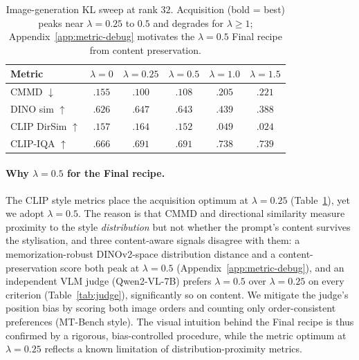 \documentclass{article}
\begin{document}
\begin{table}[t]
\centering\small
\setlength{\tabcolsep}{9pt}
\begin{tabular}{lccccc}
\toprule
\textbf{Metric} & $\lambda{=}0$ & $\lambda{=}0.25$ & $\lambda{=}0.5$ & $\lambda{=}1.0$ & $\lambda{=}1.5$ \\
\midrule
CMMD $\downarrow$       & $.155$ & $\mathbf{.100}$ & $.108$ & $.205$ & $.221$ \\
DINO sim $\uparrow$     & $.626$ & $\mathbf{.647}$ & $.643$ & $.439$ & $.388$ \\
CLIP DirSim $\uparrow$  & $.157$ & $\mathbf{.164}$ & $.152$ & $.049$ & $.024$ \\
CLIP-IQA $\uparrow$     & $.666$ & $.691$ & $\mathbf{.691}$ & $.738$ & $.739$ \\

\bottomrule
\end{tabular}
\caption{Image-generation KL sweep at rank $32$. Acquisition (bold = best) peaks
near $\lambda{=}0.25$ to $0.5$ and degrades for $\lambda\geq1$; Appendix~\ref{app:metric-debug}
motivates the $\lambda{=}0.5$ Final recipe from content preservation.}
\label{tab:kl}
\end{table}

\paragraph{Why $\lambda{=}0.5$ for the Final recipe.}
The CLIP style metrics place the acquisition optimum at $\lambda{=}0.25$
(Table~\ref{tab:kl}), yet we adopt $\lambda{=}0.5$. The reason is that CMMD and
directional similarity measure proximity to the style \emph{distribution} but not
whether the prompt's content survives the stylisation, and three content-aware
signals disagree with them: a memorization-robust DINOv2-space distribution
distance and a content-preservation score both peak at $\lambda{=}0.5$
(Appendix~\ref{app:metric-debug}), and an independent VLM judge (Qwen2-VL-7B)
prefers $\lambda{=}0.5$ over $\lambda{=}0.25$ on every criterion
(Table~\ref{tab:judge}), significantly so on content. We mitigate the judge's
position bias by scoring both image orders and counting only order-consistent
preferences (MT-Bench style). The visual intuition behind the Final recipe is thus
confirmed by a rigorous, bias-controlled procedure, while the metric optimum at
$\lambda{=}0.25$ reflects a known limitation of distribution-proximity metrics.
\end{document}
